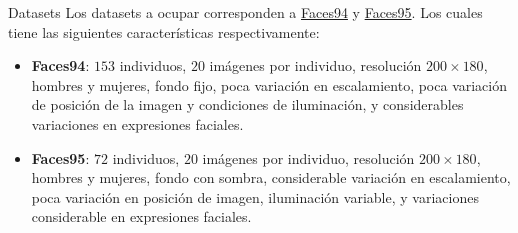 \documentclass{beamer}
\begin{document}
\begin{frame}{Datasets}
Los datasets a ocupar corresponden a \href{http://cswww.essex.ac.uk/mv/allfaces/faces94.html}{Faces94} y
\href{http://cswww.essex.ac.uk/mv/allfaces/faces95.html}{Faces95}. Los cuales tiene las siguientes características
respectivamente:
\begin{itemize}
    \item \textbf{Faces94}: $153$ individuos, $20$ imágenes por individuo, resolución $200\times 180$, hombres y mujeres, fondo fijo, poca variación en escalamiento, poca variación de posición de la imagen y condiciones de iluminación, y considerables variaciones en expresiones faciales.
    \item \textbf{Faces95}: $72$ individuos, $20$ imágenes por individuo, resolución $200\times 180$, hombres y mujeres, fondo con sombra, considerable variación en escalamiento, poca variación en posición de imagen, iluminación variable, y variaciones considerable en expresiones faciales.
\end{itemize}
\end{frame}
\end{document}
